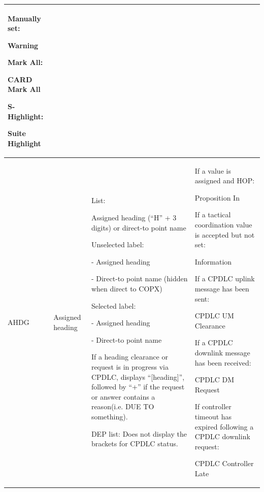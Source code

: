 \documentclass[a4paper,oneside,11pt]{memoir}
\newcounter{rowcounter}
\newcommand{\nextrow}{\refstepcounter{rowcounter}}
\newcommand{\colorref}[1]{\colorbox{Flight Highlight}{\color{#1}#1}}
\begin{document}
\begin{longtable}{|p{2.5cm}|p{2.5cm}|p{4.5cm}|p{4.5cm}|}
      \bigskip
      
      Manually set: 
      
      \colorref{Warning} 

      \bigskip 
      
      Mark All: 
      
      \colorref{CARD Mark All} 

      \bigskip 
      
      S-Highlight: 
      
      \colorref{Suite Highlight} \\ \hline
    AHDG \nextrow \label{tag:AHDG}&
      Assigned heading &
      List: 
      
      Assigned heading (“H” + 3 digits) or  direct-to point name 
      \bigskip
      
      Unselected label: 
      
      - Assigned heading 
      
      - Direct-to point name (hidden when  direct to COPX) 
      \bigskip
      
      Selected label: 
      
      - Assigned heading 
      
      - Direct-to point name 
      \bigskip
      
      If a heading clearance or request is  in progress via CPDLC, displays  “{[}heading{]}”, followed by “+” if the  request or answer contains a reason(i.e. DUE TO something). 
      \bigskip
     
      DEP list: 
      Does not display the  brackets for CPDLC status. &
      If a value is assigned and  HOP: 

      \colorref{Proposition In} 
      \bigskip

      If a tactical coordination value is accepted but not  set: 

      \colorref{Information} 
      \bigskip

      If a CPDLC uplink message  has been sent: 

      \colorref{CPDLC UM Clearance} 
      \bigskip
      
      If a CPDLC downlink  message has been  received: 

      \colorref{CPDLC DM Request} 
      \bigskip
      
      If controller timeout has expired following a CPDLC downlink request: 

      \colorref{CPDLC Controller Late} 
      \bigskip
      

\end{longtable}
\end{document}
